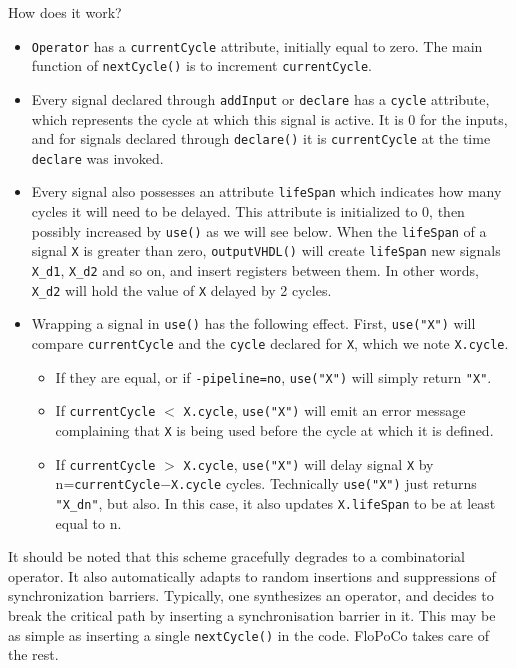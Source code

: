 \documentclass{article}
\begin{document}
How does it work? 
\begin{itemize}\item 
  \verb!Operator! has a \verb!currentCycle! attribute, initially equal to
  zero. The main function of 	\verb!nextCycle()! is to increment \verb!currentCycle!.

\item Every signal declared through \verb!addInput! or \verb!declare!
  has a \verb!cycle! attribute, which represents the cycle at which
  this signal is active. It is 0 for the inputs, and for signals
  declared through \verb!declare()! it is \verb!currentCycle!  at the
  time \verb!declare! was invoked.

\item Every signal also possesses an attribute \verb!lifeSpan! which
  indicates how many cycles it will need to be delayed. This attribute
  is initialized to 0, then possibly increased by \verb!use()! as we
  will see below. When the \verb!lifeSpan! of a signal \verb!X!  is
  greater than zero, \verb!outputVHDL()! will create \verb!lifeSpan!
  new signals \verb!X_d1!, \verb!X_d2! and so on, and insert registers
  between them. In other words, \verb!X_d2! will hold the value of
  \verb!X! delayed by 2 cycles.

\item Wrapping a signal in \verb!use()! has the following  effect. First,
  \verb!use("X")! will compare \verb!currentCycle! and the
  \verb!cycle! declared for \verb!X!, which we note \verb!X.cycle!. 
  \begin{itemize}\item 
    If they are equal, or if \verb!-pipeline=no!, \verb!use("X")! will
    simply return \verb!"X"!.
  \item If \verb!currentCycle! $<$ \verb!X.cycle!, \verb!use("X")!
    will emit an error message complaining that \verb!X! is being
    used before the cycle at which it is defined.
  \item If \verb!currentCycle! $>$ \verb!X.cycle!, \verb!use("X")!
    will delay signal \verb!X! by
    n=\verb!currentCycle!$-$\verb!X.cycle! cycles. Technically
    \verb!use("X")! just returns \verb!"X_dn"!, but also. In this case,
    it also updates \verb!X.lifeSpan! to be at least equal to n.
  \end{itemize}
\end{itemize}

It should be noted that this scheme gracefully degrades to a
combinatorial operator. It also automatically adapts to random
insertions and suppressions of synchronization barriers. Typically,
one synthesizes an operator, and decides to break the critical path by
inserting a synchronisation barrier in it. This may be as simple as
inserting a single \verb!nextCycle()! in the code. FloPoCo takes care of the rest.
\end{document}
